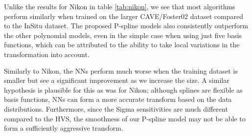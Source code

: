 Unlike the results for Nikon in table \ref{tab:nikon}, we see that most algorithms perform similarly when trained on the larger CAVE/Foster02 dataset compared to the InSitu dataset. The proposed P-spline models also consistently outperform the other polynomial models, even in the simple case when using just five basis functions, which can be attributed to the ability to take local variations in the transformation into account. 

Similarly to Nikon, the NNs perform much worse when the training dataset is smaller but see a significant improvement as we increase the size. A similar hypothesis is plausible for this as was for Nikon; although splines are flexible as basis functions, NNs can form a more accurate transform based on the data distributions. Furthermore, since the Sigma sensitivities are much different compared to the HVS, the smoothness of our P-spline model may not be able to form a sufficiently aggressive transform.

